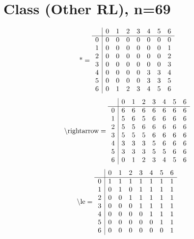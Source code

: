 \documentclass[11pt]{article}
\begin{document}
\section{Class (Other RL), n=69}
\[\text{*} = 
\begin{array}{r | r r r r r r r}
 & 0 & 1 & 2 & 3 & 4 & 5 & 6 \\ \hline
0 & 0 & 0 & 0 & 0 & 0 & 0 & 0 \\
1 & 0 & 0 & 0 & 0 & 0 & 0 & 1 \\
2 & 0 & 0 & 0 & 0 & 0 & 0 & 2 \\
3 & 0 & 0 & 0 & 0 & 0 & 0 & 3 \\
4 & 0 & 0 & 0 & 0 & 3 & 3 & 4 \\
5 & 0 & 0 & 0 & 0 & 3 & 3 & 5 \\
6 & 0 & 1 & 2 & 3 & 4 & 5 & 6 \\
\end{array}
\]
\[\text{\textbackslash rightarrow} = 
\begin{array}{r | r r r r r r r}
 & 0 & 1 & 2 & 3 & 4 & 5 & 6 \\ \hline
0 & 6 & 6 & 6 & 6 & 6 & 6 & 6 \\
1 & 5 & 6 & 5 & 6 & 6 & 6 & 6 \\
2 & 5 & 5 & 6 & 6 & 6 & 6 & 6 \\
3 & 5 & 5 & 5 & 6 & 6 & 6 & 6 \\
4 & 3 & 3 & 3 & 5 & 6 & 6 & 6 \\
5 & 3 & 3 & 3 & 5 & 5 & 6 & 6 \\
6 & 0 & 1 & 2 & 3 & 4 & 5 & 6 \\
\end{array}
\]
\[\text{\textbackslash le} = 
\begin{array}{r | r r r r r r r}
 & 0 & 1 & 2 & 3 & 4 & 5 & 6 \\ \hline
0 & 1 & 1 & 1 & 1 & 1 & 1 & 1 \\
1 & 0 & 1 & 0 & 1 & 1 & 1 & 1 \\
2 & 0 & 0 & 1 & 1 & 1 & 1 & 1 \\
3 & 0 & 0 & 0 & 1 & 1 & 1 & 1 \\
4 & 0 & 0 & 0 & 0 & 1 & 1 & 1 \\
5 & 0 & 0 & 0 & 0 & 0 & 1 & 1 \\
6 & 0 & 0 & 0 & 0 & 0 & 0 & 1 \\
\end{array}
\]
\end{document}

